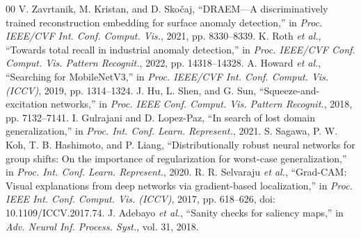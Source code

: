 \documentclass[conference,a4paper]{IEEEtran}
\begin{document}
\begin{thebibliography}{00}
 V. Zavrtanik, M. Kristan, and D. Sko\v{c}aj, ``DRAEM---A discriminatively trained reconstruction embedding for surface anomaly detection,'' in \emph{Proc. IEEE/CVF Int. Conf. Comput. Vis.}, 2021, pp. 8330--8339.
 K. Roth \emph{et al.}, ``Towards total recall in industrial anomaly detection,'' in \emph{Proc. IEEE/CVF Conf. Comput. Vis. Pattern Recognit.}, 2022, pp. 14318--14328.
 A. Howard \emph{et al.}, ``Searching for MobileNetV3,'' in \emph{Proc. IEEE/CVF Int. Conf. Comput. Vis. (ICCV)}, 2019, pp. 1314--1324.
 J. Hu, L. Shen, and G. Sun, ``Squeeze-and-excitation networks,'' in \emph{Proc. IEEE Conf. Comput. Vis. Pattern Recognit.}, 2018, pp. 7132--7141.
 I. Gulrajani and D. Lopez-Paz, ``In search of lost domain generalization,'' in \emph{Proc. Int. Conf. Learn. Represent.}, 2021.
 S. Sagawa, P. W. Koh, T. B. Hashimoto, and P. Liang, ``Distributionally robust neural networks for group shifts: On the importance of regularization for worst-case generalization,'' in \emph{Proc. Int. Conf. Learn. Represent.}, 2020.
 R. R. Selvaraju \emph{et al.}, ``Grad-CAM: Visual explanations from deep networks via gradient-based localization,'' in \emph{Proc. IEEE Int. Conf. Comput. Vis. (ICCV)}, 2017, pp. 618--626, doi: 10.1109/ICCV.2017.74.
 J. Adebayo \emph{et al.}, ``Sanity checks for saliency maps,'' in \emph{Adv. Neural Inf. Process. Syst.}, vol. 31, 2018.
\end{thebibliography}
\end{document}
